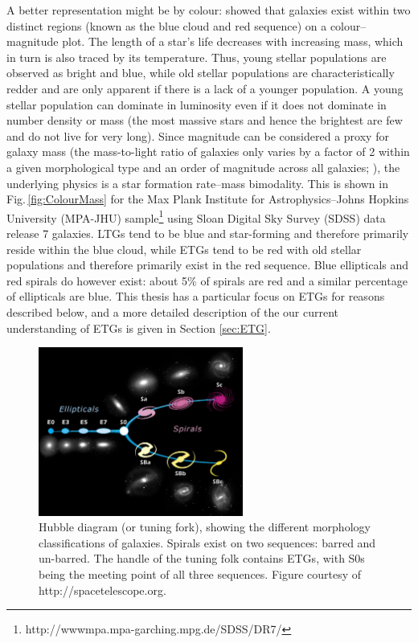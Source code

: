 	A better representation might be by colour: \citet{Baldry2004} showed that galaxies exist within two distinct regions (known as the blue cloud and red sequence) on a colour--magnitude plot. The length of a star's life decreases with increasing mass, which in turn is also traced by its temperature. Thus, young stellar populations are observed as bright and blue, while old stellar populations are characteristically redder and are only apparent if there is a lack of a younger population. A young stellar population can dominate in luminosity even if it does not dominate in number density or mass (the most massive stars and hence the brightest are few and do not live for very long). Since magnitude can be considered a proxy for galaxy mass (the mass-to-light ratio of galaxies only varies by a factor of 2 within a given morphological type and an order of magnitude across all galaxies; \citealt{Faber1979}), the underlying physics is a star formation rate--mass bimodality. This is shown in Fig.\,\ref{fig:ColourMass} for the Max Plank Institute for Astrophysics--Johns Hopkins University (MPA-JHU) sample\footnote{http://wwwmpa.mpa-garching.mpg.de/SDSS/DR7/} using Sloan Digital Sky Survey (SDSS) data release 7 galaxies. LTGs tend to be blue and star-forming and therefore primarily reside within the blue cloud, while ETGs tend to be red with old stellar populations and therefore primarily exist in the red sequence. Blue ellipticals and red spirals do however exist: about 5\% of spirals are red \citep{Masters2010} and a similar percentage of ellipticals are blue\citep{Schawinski2009}. This thesis has a particular focus on ETGs for reasons described below, and a more detailed description of the our current understanding of ETGs is given in Section \ref{sec:ETG}. 

	\begin{figure}
		\centering
		\includegraphics[width=0.6\textwidth]{introduction/hubble.jpg}
		\caption[The Hubble tuning-fork]{Hubble diagram (or tuning fork), showing the different morphology classifications of galaxies. Spirals exist on two sequences: barred and un-barred. The handle of the tuning folk contains ETGs, with S0s being the meeting point of all three sequences. Figure courtesy of http://spacetelescope.org.}
		\label{fig:Hubble}
	\end{figure}

